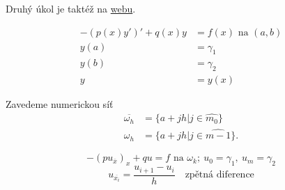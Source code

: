	Druhý úkol je taktéž na \href{http://geraldine.fjfi.cvut.cz/~oberhuber/data/vyuka/num/dcv2.pdf}{webu}.
	
	\begin{align*}
		-(p(x) y')' + q(x)y &= f(x) \text{ na } (a,b) \\
		y(a) &= \gamma_1 \\
		y(b) &= \gamma_2 \\
		y &= y(x)
	\end{align*}
	
	Zavedeme numerickou síť
	\begin{align*}
		\overline{\omega_h} &= \{ a + jh| j \in \widehat{m_0}\} \\
		\omega_h &= \{ a + jh| j \in \widehat{m-1}\}.
	\end{align*}
	
	$$ -(pu_{\overline{x}})_x + qu =f \text{ na } \omega_k;\ u_0 = \gamma_1,\ u_m = \gamma_2 $$
	$$ u_{\overline{x_i}} = \frac{u_{i+1} - u_i}{h} \quad \text{zpětná diference} $$
	

